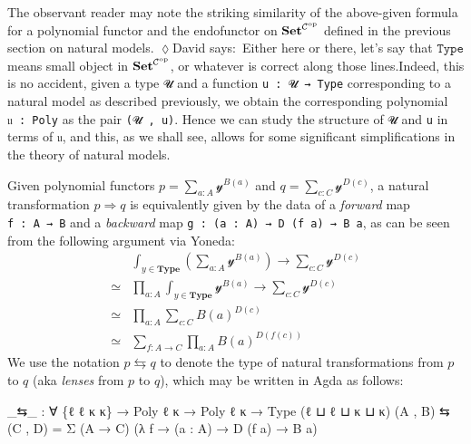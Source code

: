 \documentclass[
  11pt,
  oneside,
  article]{memoir}
\newenvironment{Shaded}{}{}
\newcommand{\NormalTok}[1]{#1}
\newcommand{\OtherTok}[1]{\textcolor[rgb]{0.00,0.44,0.13}{#1}}
\theoremstyle{definition}
\theoremstyle{plain}
\newcommand{\cat}[1]{\mathcal{#1}}%
\newcommand{\Cat}[1]{\mathbf{#1}}%
\newcommand{\op}{^\tn{op}}
\newcommand{\tn}[1]{\textnormal{#1}}
\newcommand{\smset}{\Cat{Set}}
\newcommand{\yon}{\mathcal{y}}
\newcommand{\0}{\textsf{0}}
\newcommand{\1}{\tn{\textsf{1}}}
\newcommand{\dnote}[1]{{\quad \color{blue}$\lozenge$\;David says:}~#1\;{\color{blue}$\lozenge$}\quad}
\begin{document}
The observant reader may note the striking similarity of the above-given
formula for a polynomial functor and the endofunctor on
\(\smset^{\mathcal{C}\op}\) defined in the previous section on
natural models. \dnote{Either here or there, let's say that $\texttt{Type}$ means small object in $\smset^{\cat{C}\op}$, or whatever is correct along those lines.}Indeed, this is no accident, given a type \texttt{𝓤} and
a function \texttt{u\ :\ 𝓤\ →\ Type} corresponding to a natural model as
described previously, we obtain the corresponding polynomial
\texttt{𝔲\ :\ Poly} as the pair \texttt{(𝓤\ ,\ u)}. Hence we can study
the structure of \texttt{𝓤} and \texttt{u} in terms of \texttt{𝔲}, and
this, as we shall see, allows for some significant simplifications in
the theory of natural models.

Given polynomial functors \(p = \sum_{a : A} \yon^{B(a)}\) and
\(q = \sum_{c : C} \yon^{D(c)}\), a natural transformation
\(p \Rightarrow q\) is equivalently given by the data of a
\emph{forward} map \texttt{f\ :\ A\ →\ B} and a \emph{backward} map
\texttt{g\ :\ (a\ :\ A)\ →\ D\ (f\ a)\ →\ B\ a}, as can be seen from the
following argument via Yoneda: \[
\begin{array}{rl}
& \int_{y \in \mathbf{Type}} \left( \sum_{a : A} \yon^{B(a)}  \right) \to \sum_{c : C} \yon^{D(c)}\\
\simeq & \prod_{a : A} \int_{y \in \mathbf{Type}} \yon^{B(a)} \to \sum_{c : C} \yon^{D(c)}\\
\simeq & \prod_{a : A} \sum_{c : C} B(a)^{D(c)}\\
\simeq & \sum_{f : A \to C} \prod_{a : A} B(a)^{D(f(c))}
\end{array}
\] We use the notation \(p \leftrightarrows q\) to denote the type of
natural transformations from \(p\) to \(q\) (aka \emph{lenses} from
\(p\) to \(q\)), which may be written in Agda as follows:

\begin{Shaded}
\begin{Highlighting}[]
\OtherTok{\_}\NormalTok{⇆}\OtherTok{\_} \OtherTok{:} \OtherTok{∀} \OtherTok{\{}\NormalTok{ℓ ℓ\textquotesingle{} κ κ\textquotesingle{}}\OtherTok{\}} \OtherTok{→}\NormalTok{ Poly ℓ κ }\OtherTok{→}\NormalTok{ Poly ℓ\textquotesingle{} κ\textquotesingle{} }\OtherTok{→}\NormalTok{ Type }\OtherTok{(}\NormalTok{ℓ ⊔ ℓ\textquotesingle{} ⊔ κ ⊔ κ\textquotesingle{}}\OtherTok{)}
\OtherTok{(}\NormalTok{A , B}\OtherTok{)}\NormalTok{ ⇆ }\OtherTok{(}\NormalTok{C , D}\OtherTok{)} \OtherTok{=}\NormalTok{ Σ }\OtherTok{(}\NormalTok{A }\OtherTok{→}\NormalTok{ C}\OtherTok{)} \OtherTok{(λ}\NormalTok{ f }\OtherTok{→} \OtherTok{(}\NormalTok{a }\OtherTok{:}\NormalTok{ A}\OtherTok{)} \OtherTok{→}\NormalTok{ D }\OtherTok{(}\NormalTok{f a}\OtherTok{)} \OtherTok{→}\NormalTok{ B a}\OtherTok{)}
\end{Highlighting}
\end{Shaded}
\end{document}
